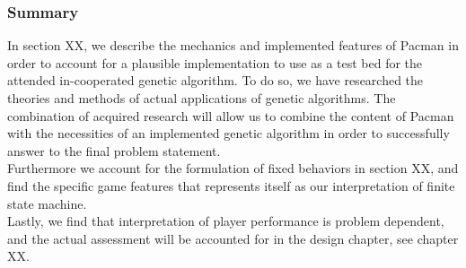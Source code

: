 \subsubsection{Summary}
In section XX, we describe the mechanics and implemented features of Pacman in order to account for a plausible implementation to use as a test bed for the attended in-cooperated genetic algorithm. To do so, we have researched the theories and methods of actual applications of genetic algorithms. The combination of acquired research  will allow us to combine the content of Pacman with the necessities of an implemented genetic algorithm in order to successfully answer to the final problem statement.\\
Furthermore we account for the formulation of fixed behaviors in section XX, and find the specific game features that represents itself as our interpretation of finite state machine.\\
Lastly, we find that interpretation of player performance is problem dependent, and the actual assessment will be accounted for in the design chapter, see chapter XX.